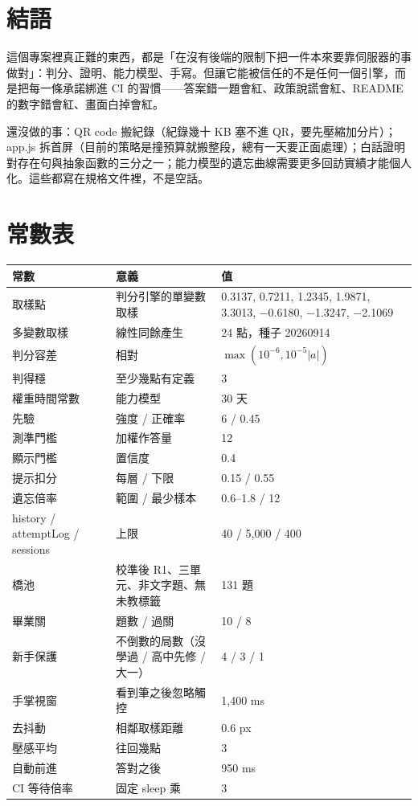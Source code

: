 \documentclass[11pt,a4paper,oneside]{report}
\renewcommand{\_}{\ifmmode\origunderscore\else\textunderscore\allowbreak\fi}
\begin{document}
\chapter{結語}
這個專案裡真正難的東西，都是「在沒有後端的限制下把一件本來要靠伺服器的事做對」：判分、證明、能力模型、手寫。但讓它能被信任的不是任何一個引擎，而是把每一條承諾綁進 CI 的習慣——答案錯一題會紅、政策說謊會紅、README 的數字錯會紅、畫面白掉會紅。

還沒做的事：QR code 搬紀錄（紀錄幾十 KB 塞不進 QR，要先壓縮加分片）；app.js 拆首屏（目前的策略是撞預算就搬整段，總有一天要正面處理）；白話證明對存在句與抽象函數的三分之一；能力模型的遺忘曲線需要更多回訪實績才能個人化。這些都寫在規格文件裡，不是空話。

\appendix
\chapter{常數表}
\begin{table}[h]
\centering\small\sffamily
\begin{tabularx}{\textwidth}{@{}p{3.4cm}YY@{}}
\toprule
常數 & 意義 & 值 \\
\midrule
取樣點 & 判分引擎的單變數取樣 & 0.3137, 0.7211, 1.2345, 1.9871, 3.3013, −0.6180, −1.3247, −2.1069 \\
多變數取樣 & 線性同餘產生 & 24 點，種子 20260914 \\
判分容差 & 相對 & $\max(10^{-6}, 10^{-5}|a|)$ \\
判得穩 & 至少幾點有定義 & 3 \\
權重時間常數 & 能力模型 & 30 天 \\
先驗 & 強度 / 正確率 & 6 / 0.45 \\
測準門檻 & 加權作答量 & 12 \\
顯示門檻 & 置信度 & 0.4 \\
提示扣分 & 每層 / 下限 & 0.15 / 0.55 \\
遺忘倍率 & 範圍 / 最少樣本 & 0.6–1.8 / 12 \\
history / attemptLog / sessions & 上限 & 40 / 5,000 / 400 \\
橋池 & 校準後 R1、三單元、非文字題、無未教標籤 & 131 題 \\
畢業關 & 題數 / 過關 & 10 / 8 \\
新手保護 & 不倒數的局數（沒學過 / 高中先修 / 大一） & 4 / 3 / 1 \\
手掌視窗 & 看到筆之後忽略觸控 & 1,400 ms \\
去抖動 & 相鄰取樣距離 & 0.6 px \\
壓感平均 & 往回幾點 & 3 \\
自動前進 & 答對之後 & 950 ms \\
CI 等待倍率 & 固定 sleep 乘 & 3 \\
\bottomrule
\end{tabularx}
\end{table}
\end{document}
